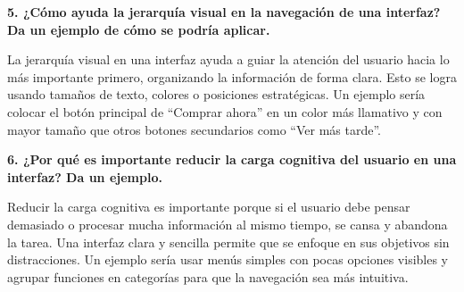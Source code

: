 \documentclass[12pt, a4paper]{article}
\begin{document}
\textbf{5. ¿Cómo ayuda la jerarquía visual en la navegación de una interfaz? Da un ejemplo de cómo se podría aplicar.}  

La jerarquía visual en una interfaz ayuda a guiar la atención del usuario hacia lo más
importante primero, organizando la información de forma clara. Esto se logra usando tamaños de
texto, colores o posiciones estratégicas. Un ejemplo sería colocar el botón principal de
“Comprar ahora” en un color más llamativo y con mayor tamaño que otros botones secundarios como
“Ver más tarde”.  

\textbf{6. ¿Por qué es importante reducir la carga cognitiva del usuario en una interfaz? Da un ejemplo.}  

Reducir la carga cognitiva es importante porque si el usuario debe pensar demasiado o procesar
mucha información al mismo tiempo, se cansa y abandona la tarea. Una interfaz clara y sencilla
permite que se enfoque en sus objetivos sin distracciones. Un ejemplo sería usar menús simples
con pocas opciones visibles y agrupar funciones en categorías para que la navegación sea más
intuitiva.  
\end{document}
